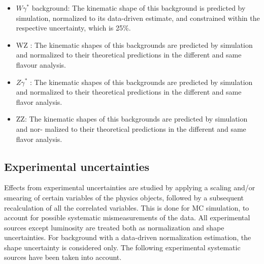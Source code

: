 \begin{itemize}
\item $W \gamma^*$ background: The kinematic shape of this background is predicted by simulation, normalized to its data-driven estimate, and constrained within the respective
uncertainty, which is 25\%.
\item WZ : The kinematic shapes of this backgrounds are predicted by simulation and
normalized to their theoretical predictions in the different and same flavour analysis.

\item $ Z \gamma^*$  : The kinematic shapes of this backgrounds are predicted by simulation and
normalized to their theoretical predictions in the different and same flavor analysis.

\item ZZ: The kinematic shapes of this backgrounds are predicted by simulation and nor-
malized to their theoretical predictions in the different and same flavor analysis.

\end{itemize}




\subsection*{Experimental uncertainties}
Effects from experimental uncertainties are studied by applying a scaling and/or smearing of
certain variables of the physics objects, followed by a subsequent recalculation of all the correlated variables. This is done for MC simulation, to account for possible systematic mismeasurements of the data. All experimental sources except luminosity are treated both as normalization and shape uncertainties. For background with a data-driven normalization estimation,
the shape uncertainty is considered only. The following experimental systematic sources have
been taken into account.

